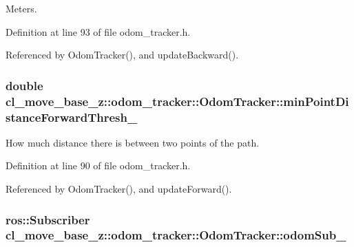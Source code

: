 Meters. 



Definition at line 93 of file odom\+\_\+tracker.\+h.



Referenced by Odom\+Tracker(), and update\+Backward().

\subsubsection[{\texorpdfstring{min\+Point\+Distance\+Forward\+Thresh\+\_\+}{minPointDistanceForwardThresh_}}]{\setlength{\rightskip}{0pt plus 5cm}double cl\+\_\+move\+\_\+base\+\_\+z\+::odom\+\_\+tracker\+::\+Odom\+Tracker\+::min\+Point\+Distance\+Forward\+Thresh\+\_\+\hspace{0.3cm}{\ttfamily [protected]}}\hypertarget{classcl__move__base__z_1_1odom__tracker_1_1OdomTracker_a2a11c48d1da1f1c9b921ef37c8db6325}{}\label{classcl__move__base__z_1_1odom__tracker_1_1OdomTracker_a2a11c48d1da1f1c9b921ef37c8db6325}


How much distance there is between two points of the path. 



Definition at line 90 of file odom\+\_\+tracker.\+h.



Referenced by Odom\+Tracker(), and update\+Forward().

\subsubsection[{\texorpdfstring{odom\+Sub\+\_\+}{odomSub_}}]{\setlength{\rightskip}{0pt plus 5cm}ros\+::\+Subscriber cl\+\_\+move\+\_\+base\+\_\+z\+::odom\+\_\+tracker\+::\+Odom\+Tracker\+::odom\+Sub\+\_\+\hspace{0.3cm}{\ttfamily [protected]}}\hypertarget{classcl__move__base__z_1_1odom__tracker_1_1OdomTracker_ab55df0e91246e43dff80912dc35a4fee}{}\label{classcl__move__base__z_1_1odom__tracker_1_1OdomTracker_ab55df0e91246e43dff80912dc35a4fee}


